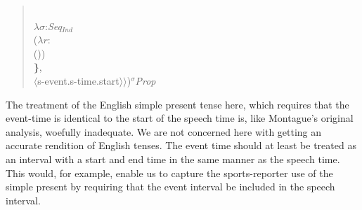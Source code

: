 \begin{quote}
{{{{                                                \\ \hspace*{4em}$\lambda\sigma$:\textit{Seq}$_{\textit{Ind}}$ \\
\hspace*{5em}($\lambda
r$: \\ 
\hspace*{6em} ()) \\
\hspace*{4em}\textbf{\}}, \\
\hspace*{6em}$\langle$s-event.s-time.start$\rangle\rangle$)}{$^\sigma$\textit{Prop}}}}}

\end{quote}


The treatment of the English simple present tense here, which requires
that the event-time is identical to the start of the speech time is,
like Montague's original analysis, woefully inadequate.  We are not
concerned here with getting an accurate rendition of English tenses.
The event time should at least be treated as an interval with a start
and end time in the same
manner as the speech time.  This would, for example, enable us to
capture the sports-reporter use of the simple present by requiring that
the event interval be included in the speech interval.

